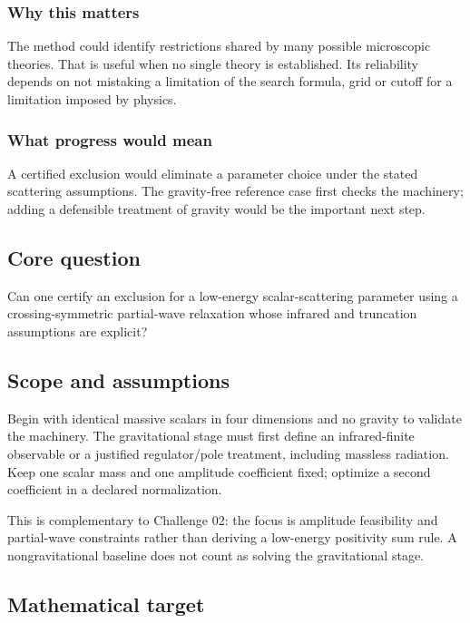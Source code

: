 \documentclass[
  11pt,
]{article}
\begin{document}
\subsubsection{Why this matters}

The method could identify restrictions shared by many possible
microscopic theories. That is useful when no single theory is
established. Its reliability depends on not mistaking a limitation of
the search formula, grid or cutoff for a limitation imposed by physics.

\subsubsection{What progress would mean}

A certified exclusion would eliminate a parameter choice under the
stated scattering assumptions. The gravity-free reference case first
checks the machinery; adding a defensible treatment of gravity would be
the important next step.

\subsection{Core question}

Can one certify an exclusion for a low-energy scalar-scattering
parameter using a crossing-symmetric partial-wave relaxation whose
infrared and truncation assumptions are explicit?

\subsection{Scope and assumptions}

Begin with identical massive scalars in four dimensions and no gravity
to validate the machinery. The gravitational stage must first define an
infrared-finite observable or a justified regulator/pole treatment,
including massless radiation. Keep one scalar mass and one amplitude
coefficient fixed; optimize a second coefficient in a declared
normalization.

This is complementary to Challenge 02: the focus is amplitude
feasibility and partial-wave constraints rather than deriving a
low-energy positivity sum rule. A nongravitational baseline does not
count as solving the gravitational stage.

\subsection{Mathematical target}
\end{document}
